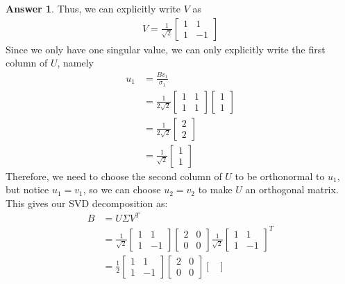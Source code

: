 \documentclass[10pt,a4paper]{article}
\theoremstyle{definition}
\newtheorem*{answer*}{Answer}
\theoremstyle{definition}
\numberwithin{equation}{section}
\begin{document}
\begin{answer*}
Thus, we can explicitly write $V$ as 
\begin{align*}
V = \frac{1}{\sqrt{2}}\begin{bmatrix}
1 & 1\\1 & -1
\end{bmatrix}
\end{align*}
Since we only have one singular value, we can only explicitly write the first column of $U$, namely
\begin{align*}
u_1 &= \frac{Bv_1}{\sigma_1}\\
&= \frac{1}{2 \sqrt{2}} \begin{bmatrix}
1 & 1\\1 & 1
\end{bmatrix} \begin{bmatrix}
1\\1
\end{bmatrix}\\
&= \frac{1}{2\sqrt{2}}\begin{bmatrix}
2\\2
\end{bmatrix}\\
&= \frac{1}{\sqrt{2}}\begin{bmatrix}
1\\1
\end{bmatrix}
\end{align*}
Therefore, we need to choose the second column of $U$ to be orthonormal to $u_1$, but notice $u_1 = v_1$, so we can choose $u_2 = v_2$ to make $U$ an orthogonal matrix. This gives our SVD decomposition as:
\begin{align*}
B &= U\Sigma V^T\\
&= \frac{1}{\sqrt{2}}\begin{bmatrix}
1 & 1\\1 & -1
\end{bmatrix} \begin{bmatrix}
2 & 0\\0 & 0
\end{bmatrix} \frac{1}{\sqrt{2}} \begin{bmatrix}
1 & 1\\1 & -1
\end{bmatrix}^T\\
&= \frac{1}{2} \begin{bmatrix}
1 & 1\\1 & -1
\end{bmatrix} \begin{bmatrix}
2 & 0\\0 & 0
\end{bmatrix} \begin{bmatrix}

\end{bmatrix}
\end{align*}
\end{answer*}
\end{document}
